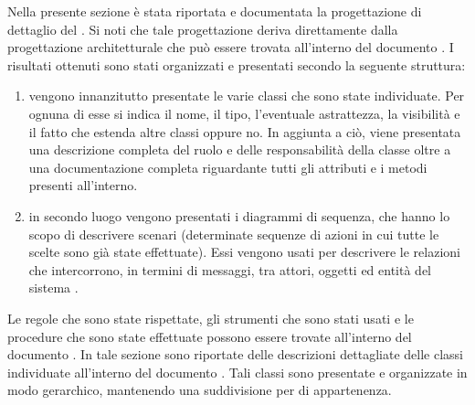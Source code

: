 	Nella presente sezione è stata riportata e documentata la progettazione di dettaglio del  . Si noti che tale progettazione deriva direttamente dalla progettazione architetturale che può essere trovata all'interno del documento . I risultati ottenuti sono stati organizzati e presentati secondo la seguente struttura:
	\begin{enumerate}
		\item vengono innanzitutto presentate le varie classi che sono state individuate. Per ognuna di esse si indica il nome, il tipo, l'eventuale astrattezza, la visibilità e il fatto che estenda altre classi oppure no. In aggiunta a ciò, viene presentata una descrizione completa del ruolo e delle responsabilità della classe oltre a una documentazione completa riguardante tutti gli attributi e i metodi presenti all'interno.
		\item in secondo luogo vengono presentati i diagrammi di sequenza, che hanno lo scopo di descrivere scenari (determinate sequenze di azioni in cui tutte le scelte sono già state effettuate). Essi vengono usati per descrivere le relazioni che intercorrono, in termini di messaggi, tra attori, oggetti ed entità del sistema .
	\end{enumerate}
	Le regole che sono state rispettate, gli strumenti che sono stati usati e le procedure che sono state effettuate possono essere trovate all'interno del documento .
    	In tale sezione sono riportate delle descrizioni dettagliate delle classi individuate all'interno del documento . Tali classi sono presentate e organizzate in modo gerarchico, mantenendo una suddivisione per  di appartenenza.
        
        

